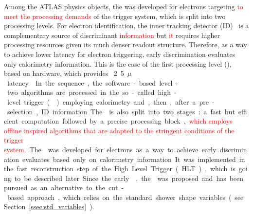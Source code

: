 

Among the ATLAS physics objects, the \rnn{} was developed for electrons targeting \textcolor{red}{to meet the processing demands} of the trigger system, which is split into two processing levels.  For electron identification, the inner tracking detector (ID)~\cite{PERF-2007-01} is a complementary source of discriminant \textcolor{red}{information} but \textcolor{red}{it} requires higher processing resources given its much denser readout structure.  Therefore, as a way to achieve lower latency for electron triggering, early discrimination evaluates only calorimetry information. This is the case of the first processing level (\licalo), based on hardware, which provides \SI{}2.5{$\mu$} latency~\cite{TRIG-2016-01}. In the sequence, the software-based level-two algorithms are processed in the so-called high-level trigger (\hlt{}) employing calorimetry and, then, after a pre-selection, ID information.  

The \hlt{} is also split into two stages: a fast but efficient computation followed by a precise processing block, \textcolor{red}{which employs offline inspired algorithms that are adapted to the stringent conditions of the trigger system.} 
The \rnn{} was developed for electrons as a way to achieve early discrimination evaluates based only on calorimetry information. It was implemented in the fast reconstruction step of the High Level Trigger (HLT), which is going to be described later.  Since the early~\cite{1995_seixas_ringer}, the \rnn{} was proposed and has been
pursued as an alternative to the cut-based approach, which relies on the standard shower shape variables (see Section~\ref{ssec:std_variables}).

